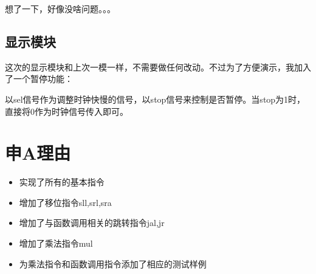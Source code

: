 \documentclass[12pt]{article} %
\begin{document}
\begin{sloppypar}
想了一下，好像没啥问题。。。

\subsection{显示模块}

这次的显示模块和上次一模一样，不需要做任何改动。不过为了方便演示，我加入了一个暂停功能：

以sel信号作为调整时钟快慢的信号，以stop信号来控制是否暂停。当stop为1时，直接将0作为时钟信号传入即可。

\section{申A理由}

\begin{itemize}
\item 实现了所有的基本指令
\item 增加了移位指令sll,srl,sra
\item 增加了与函数调用相关的跳转指令jal,jr
\item 增加了乘法指令mul
\item 为乘法指令和函数调用指令添加了相应的测试样例
\end{itemize}

\end{sloppypar}
\end{document}
